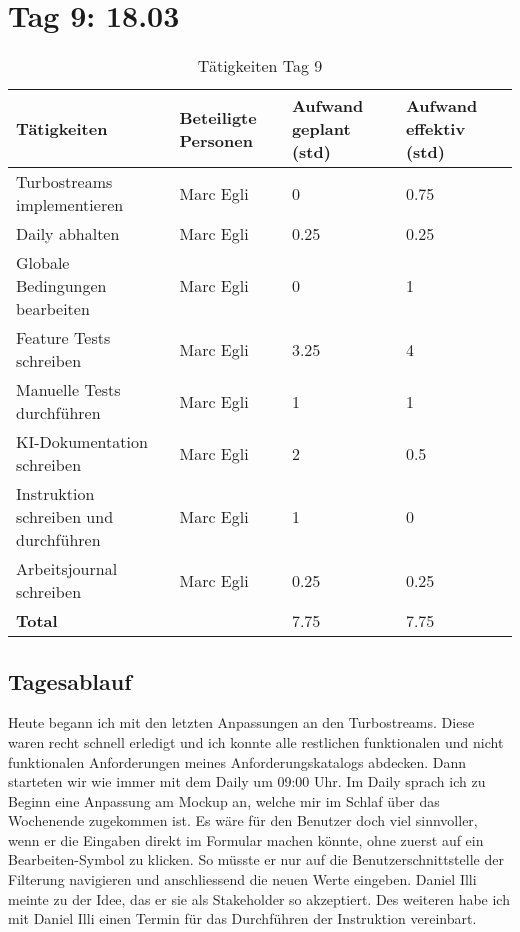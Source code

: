 \section{Tag 9: 18.03}
\begin{table}[H]
    \begin{tabular}{|L{0.4\textwidth}|C{60pt}|C{60pt}|C{60pt}|}
        \hline
        \color{white}Tätigkeiten & \color{white}Beteiligte \color{white}Personen & \color{white}Aufwand geplant (std) & \color{white}Aufwand effektiv (std) \\
        \hline
         Turbostreams implementieren & Marc Egli & 0 & 0.75 \\
        \hline
        Daily abhalten & Marc Egli & 0.25 & 0.25 \\
        \hline
        Globale Bedingungen bearbeiten & Marc Egli & 0 & 1 \\
        \hline
        Feature Tests schreiben & Marc Egli & 3.25 & 4 \\
        \hline
        Manuelle Tests durchführen & Marc Egli & 1 & 1 \\
        \hline
        KI-Dokumentation schreiben & Marc Egli & 2 & 0.5 \\
        \hline
        Instruktion schreiben und durchführen & Marc Egli & 1 & 0 \\
        \hline
        Arbeitsjournal schreiben & Marc Egli & 0.25 & 0.25 \\
        \hline
        \textbf{Total} &  & 7.75  & 7.75 \\
        \hline
    \end{tabular}
    \caption{Tätigkeiten Tag 9}
\end{table}

\subsection*{Tagesablauf}
Heute begann ich mit den letzten Anpassungen an den Turbostreams. Diese waren recht schnell erledigt und ich konnte alle restlichen funktionalen und nicht
funktionalen Anforderungen meines Anforderungskatalogs abdecken. Dann starteten wir wie immer mit dem Daily um 09:00 Uhr.
Im Daily sprach ich zu Beginn eine Anpassung am Mockup an, welche mir im Schlaf über das Wochenende zugekommen ist. Es wäre für den Benutzer doch viel sinnvoller, 
wenn er die Eingaben direkt im Formular machen könnte, ohne zuerst auf ein Bearbeiten-Symbol zu klicken. So müsste er nur auf die Benutzerschnittstelle der Filterung navigieren
und anschliessend die neuen Werte eingeben. Daniel Illi meinte zu der Idee, das er sie als Stakeholder so akzeptiert. 
Des weiteren habe ich mit Daniel Illi einen Termin für das Durchführen der Instruktion vereinbart. 

